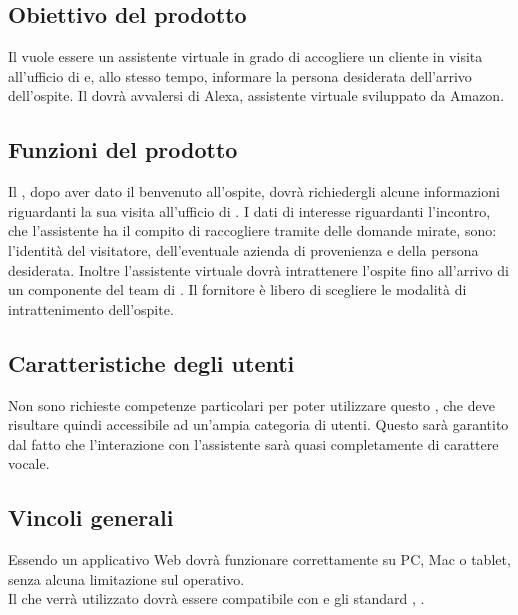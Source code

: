 \subsection{Obiettivo del prodotto}
Il  vuole essere un assistente virtuale in grado di accogliere un cliente in visita all'ufficio di \PROPONENTE{} e, allo stesso tempo, informare la persona desiderata dell'arrivo dell'ospite. Il  dovrà avvalersi di Alexa, assistente virtuale sviluppato da Amazon.
\subsection{Funzioni del prodotto}
Il , dopo aver dato il benvenuto all'ospite, dovrà richiedergli alcune informazioni riguardanti la sua visita all'ufficio di \PROPONENTE. 
I dati di interesse riguardanti l'incontro, che l'assistente ha il compito di raccogliere tramite delle domande mirate, sono: l'identità del visitatore, dell'eventuale azienda di provenienza e della persona desiderata. Inoltre l'assistente virtuale dovrà intrattenere l'ospite fino all'arrivo di un componente del team di \PROPONENTE{}. Il fornitore è libero di scegliere le modalità di intrattenimento dell'ospite.  
\subsection{Caratteristiche degli utenti}
Non sono richieste competenze particolari per poter utilizzare questo , che deve risultare
quindi accessibile ad un'ampia categoria di utenti. Questo sarà garantito dal fatto che l'interazione con l'assistente sarà quasi completamente di carattere vocale.
\subsection{Vincoli generali}
Essendo un applicativo Web dovrà funzionare correttamente su PC, Mac o tablet, senza alcuna limitazione sul  operativo.\\
Il  che verrà utilizzato dovrà essere compatibile con  e gli standard , .